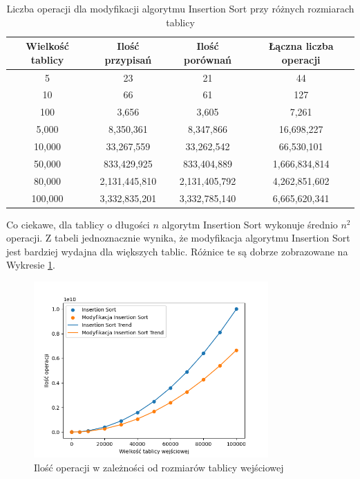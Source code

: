 \documentclass{article}
\begin{document}
\begin{table}[H]
    \centering
    \begin{tabular}{|c|c|c|c|}
    \hline
    \textbf{Wielkość tablicy} & \textbf{Ilość przypisań} & \textbf{Ilość porównań} & \textbf{Łączna liczba operacji} \\ \hline
    5 & 23 & 21 & 44 \\ \hline
    10 & 66 & 61 & 127 \\ \hline
    100 & 3,656 & 3,605 & 7,261 \\ \hline
    5,000 & 8,350,361 & 8,347,866 & 16,698,227 \\ \hline
    10,000 & 33,267,559 & 33,262,542 & 66,530,101 \\ \hline
    50,000 & 833,429,925 & 833,404,889 & 1,666,834,814 \\ \hline
    80,000 & 2,131,445,810 & 2,131,405,792 & 4,262,851,602 \\ \hline
    100,000 & 3,332,835,201 & 3,332,785,140 & 6,665,620,341 \\ \hline
    \end{tabular}
    \caption{Liczba operacji dla modyfikacji algorytmu Insertion Sort przy różnych rozmiarach tablicy}
    \label{tab:m_insertion_results}
\end{table}
Co ciekawe, dla tablicy o długości \( n \) algorytm Insertion Sort wykonuje średnio $n^2$ operacji. Z tabeli jednoznacznie wynika, że modyfikacja algorytmu Insertion Sort jest bardziej wydajna dla większych tablic. Różnice te są dobrze zobrazowane na Wykresie \ref{fig:insertion}.
\begin{figure}[H]
    \centering
    \includegraphics[width=0.8\textwidth]{Figure_1.png}
    \caption{Ilość operacji w zależności od rozmiarów tablicy wejściowej}
    \label{fig:insertion}
\end{figure}
\end{document}
